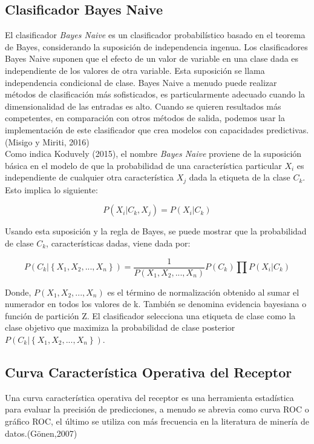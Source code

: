 \subsection{Clasificador Bayes Naive}

El clasificador \textit{Bayes Naive} es un clasificador probabilístico basado en el teorema de Bayes, considerando la suposición de independencia ingenua. Los clasificadores Bayes Naive suponen que el efecto de un valor de variable en una clase dada es independiente de los valores de otra variable. Esta suposición se llama independencia condicional de clase. Bayes Naive a menudo puede realizar métodos de clasificación más sofisticados, es particularmente adecuado cuando la dimensionalidad de las entradas es alto. Cuando se quieren resultados más competentes, en comparación con otros métodos de salida, podemos usar la implementación de este clasificador que crea modelos con capacidades predictivas.(Misigo y Miriti, 2016)\\

Como indica Koduvely (2015), el nombre \textit{Bayes Naive} proviene de la suposición básica en el modelo de que la probabilidad de una característica particular $X_{i}$ es independiente de cualquier otra característica $X_{j}$ dada la etiqueta de la clase $C_{k}$. Esto implica lo siguiente:

	\[P\left(X_{i}|C_{k},X_{j}\right)=P\left(X_{i}|C_{k}\right)
\]

Usando esta suposición y la regla de Bayes, se puede mostrar que la probabilidad de clase $C_{k}$, características dadas, viene dada por:

	\[P\left(C_{k}|\left\{X_{1},X_{2},...,X_{n}\right\}\right)=\frac{1}{P\left(X_{1},X_{2},...,X_{n}\right)}P\left(C_{k}\right)\prod{P\left(X_{i}|C_{k}\right)}
\]

Donde, $P\left(X_{1},X_{2},...,X_{n}\right)$ es el término de normalización obtenido al sumar el numerador en todos los valores de k. También se denomina evidencia bayesiana o función de partición Z. El clasificador selecciona una etiqueta de clase como la clase objetivo que maximiza la probabilidad de clase posterior $P\left(C_{k}|\left\{X_{1},X_{2},...,X_{n}\right\}\right)$.

\subsection{Curva Característica Operativa del Receptor}

Una curva característica operativa del receptor es una herramienta estadística para evaluar la precisión de predicciones, a menudo se abrevia como curva ROC o gráfico ROC, el último se utiliza con más frecuencia en la literatura de minería de datos.(Gönen,2007)\\

